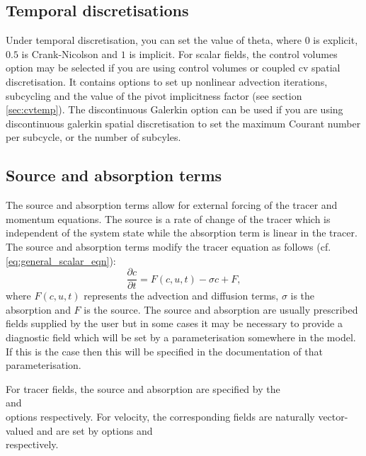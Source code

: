 \subsection{Temporal discretisations}
\label{sec:configuring_fluidity_temporal_discretisation}
Under temporal discretisation, you can set the value of theta, where $0$ is explicit, $0.5$ is Crank-Nicolson and $1$ is implicit. For scalar fields, the control volumes option may be selected if you are using control volumes or coupled cv spatial discretisation.  It contains options to set up nonlinear advection iterations, subcycling and the value of the pivot implicitness factor (see section \ref{sec:cvtemp}). The discontinuous Galerkin option can be used if you are using discontinuous galerkin spatial discretisation to set the maximum Courant number per subcycle, or the number of subcyles. 

\subsection{Source and absorption terms}\label{sec:Source}

The source and absorption terms allow for external forcing of the tracer and
momentum equations. The source is a rate of change of the tracer which is
independent of the system state while the absorption term is linear in the
tracer. The source and absorption terms modify the tracer
equation as follows (cf. \eqref{eq:general_scalar_eqn}):
\begin{equation}
  \frac{\partial c}{\partial t} = F(c,u,t) - \sigma c + F,
\end{equation}
where $F(c,u,t)$ represents the advection and diffusion terms, $\sigma$ is the
absorption and $F$ is the source. The source and absorption are usually
prescribed fields supplied by the user but in some cases it may be necessary
to provide a diagnostic field which will be set by a parameterisation
somewhere in the model. If this is the case then this will be specified in
the documentation of that parameterisation.

For tracer fields, the source and absorption are specified by the\onlypdf\\
 and\onlypdf\\
 options
respectively. For velocity, the corresponding fields are naturally
vector-valued and are set by options\onlypdf\linebreak
{} and\onlypdf\\
respectively.

